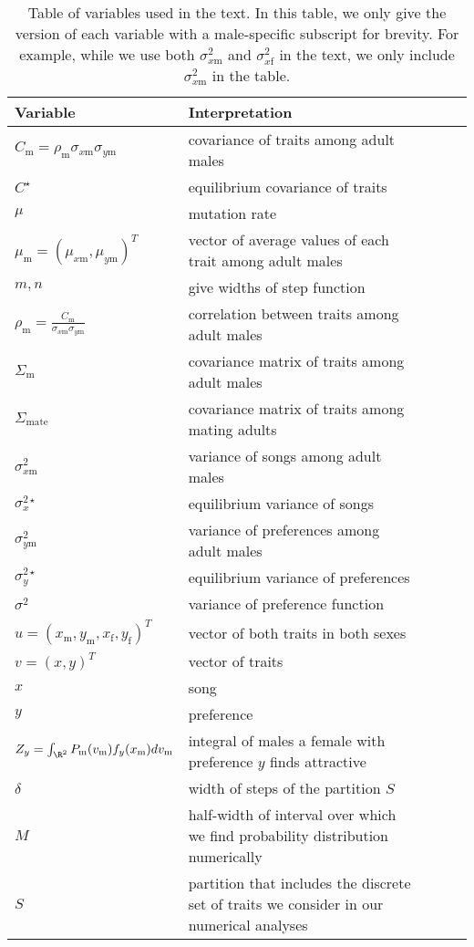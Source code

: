 \documentclass{article}
\newcommand{\x}[1]{\text{#1}}
\begin{document}
\begin{table}
\caption{\label{variables} Table of variables used in the text. In this table, we only give the version of each variable with a male-specific subscript for brevity. For example, while we use both $\sigma_{x\x{m}}^2$ and $\sigma_{x\x{f}}^2$ in the text, we only include $\sigma_{x\x{m}}^2$ in the table.}
\begin{tabular}{lllll}
Variable & Interpretation
\\\hline $C_\x{m}=\rho_\x{m}\sigma_{x\x{m}}\sigma_{y\x{m}}$ & covariance of traits among adult males
\\ $C^\star$ & equilibrium covariance of traits
\\ $\mu$ & mutation rate 
\\$\mu_\x{m}=(\mu_{x\x{m}},\mu_{y\x{m}})^T$ & vector of average values of each trait among adult males 
\\$m,n$ & give widths of step function
\\ $\rho_\x{m}=\frac{C_\x{m}}{\sigma_{x\x{m}}\sigma_{y\x{m}}}$ & correlation between traits among adult males
\\$\Sigma_\x{m}$ & covariance matrix of traits among adult males
\\$\Sigma_\text{mate}$ & covariance matrix of traits among mating adults
\\$\sigma_{x\x{m}}^2$ & variance of songs among adult males
\\$\sigma_{x}^{2\star}$ & equilibrium variance of songs
\\$\sigma_{y\x{m}}^2$ & variance of preferences among adult males
\\$\sigma_y^{2\star}$ & equilibrium variance of preferences
\\$\sigma^2$ & variance of preference function
\\$u=(x_\x{m},y_\x{m},x_\x{f},y_\x{f})^T$ & vector of both traits in both sexes
\\$v=(x,y)^T$ & vector of traits
\\$x$ & song
\\$y$ & preference
\\$Z_y=\int_{\R^2}P_\x{m}(v_\x{m})f_{y}(x_\x{m})dv_\x{m}$ & integral of males a female with preference $y$ finds attractive
\\ $\delta$ & width of steps of the partition $S$
\\ $M$ & half-width of interval over which we find probability distribution numerically
\\ $S$ & partition that includes the discrete set of traits we consider in our numerical analyses
\end{tabular}
\end{table}
\end{document}
